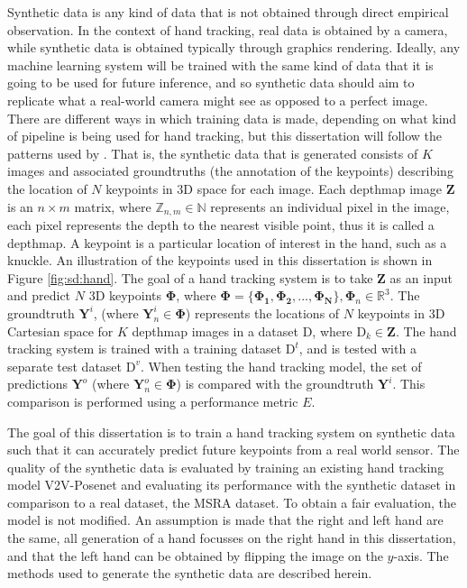 Synthetic data is any kind of data that is not obtained through direct empirical observation. In the context of hand tracking, real data is obtained by a camera, while synthetic data is obtained typically through graphics rendering. Ideally, any machine learning system will be trained with the same kind of data that it is going to be used for future inference, and so synthetic data should aim to replicate what a real-world camera might see as opposed to a perfect image. There are different ways in which training data is made, depending on what kind of pipeline is being used for hand tracking, but this dissertation will follow the patterns used by \cite{yuan2017bighand2, sun2015cascaded}. That is, the synthetic data that is generated consists of $K$ images and associated groundtruths (the annotation of the keypoints) describing the location of $N$ keypoints in 3D space for each image. Each depthmap image $\bm{Z}$ is an $n\times m$ matrix, where $\mathbb{Z}_{n,m} \in \mathbb{N}$ represents an individual pixel in the image, each pixel represents the depth to the nearest visible point, thus it is called a depthmap. A keypoint is a particular location of interest in the hand, such as a knuckle. An illustration of the keypoints used in this dissertation is shown in Figure \ref{fig:sd:hand}. The goal of a hand tracking system is to take $\bm{Z}$ as an input and predict $N$ 3D keypoints $\bm{\Phi}$, where $\bm{\Phi}=\{\bm{\Phi_1}, \bm{\Phi_2}, ..., \bm{\Phi_N}\}, \bm\Phi_{n} \in \mathbb{R}^{3}$. The groundtruth $\bm{Y}^i$, (where $\bm{Y}^i_n\in \bm{\Phi}$) represents the locations of $N$ keypoints in 3D Cartesian space for $K$ depthmap images in a dataset $\bm{\mathrm{D}}$, where $\bm{\mathrm{D}}_k\in\bm{Z}$. The hand tracking system is trained with a training dataset $\bm{\mathrm{D}}^t$, and is tested with a separate test dataset $\bm{\mathrm{D}}^v$. When testing the hand tracking model, the set of predictions $\bm{Y}^o$ (where $\bm{Y}^o_n\in \bm{\Phi}$) is compared with the groundtruth $\bm{Y}^i$. This comparison is performed using a performance metric $E$.

The goal of this dissertation is to train a hand tracking system on synthetic data such that it can accurately predict future keypoints from a real world sensor. The quality of the synthetic data is evaluated by training an existing hand tracking model V2V-Posenet\cite{moon2018v2v} and evaluating its performance with the synthetic dataset in comparison to a real dataset, the MSRA dataset\cite{sun2015cascaded}. To obtain a fair evaluation, the model is not modified. An assumption is made that the right and left hand are the same, all generation of a hand focusses on the right hand in this dissertation, and that the left hand can be obtained by flipping the image on the $y$-axis. The methods used to generate the synthetic data are described herein.

